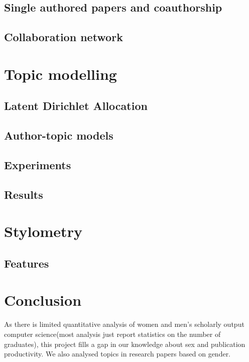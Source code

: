 \documentclass[bsc,frontabs,twoside,singlespacing,parskip,deptreport]{infthesis}     %
\begin{document}
\section{Single authored papers and coauthorship}
\section{Collaboration network}

\chapter{Topic modelling}
\label{ch:topics}
\section{Latent Dirichlet Allocation}
\section{Author-topic models}
\section{Experiments}
\section{Results}

\chapter{Stylometry}
\label{ch:style}
\section{Features}

\chapter{Conclusion}
As there is limited quantitative analysis of women and
men's scholarly output computer science(most analysis just report statistics on the number of graduates), this project
fills a gap in our knowledge about sex and publication productivity. We also analysed topics in research papers based on gender.

\tableofcontents




\end{document}
